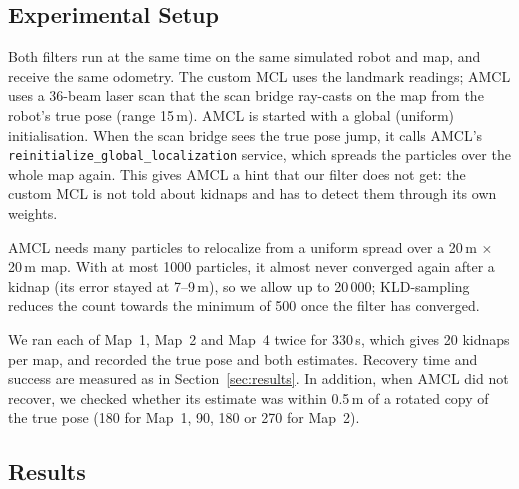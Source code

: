 \documentclass[12pt, a4paper]{article}
\begin{document}
\subsection{Experimental Setup}
Both filters run at the same time on the same simulated robot and map, and receive the same odometry.  The custom MCL uses the landmark readings; AMCL uses a 36-beam laser scan that the scan bridge ray-casts on the map from the robot's true pose (range 15\,m).  AMCL is started with a global (uniform) initialisation.  When the scan bridge sees the true pose jump, it calls AMCL's \texttt{reinitialize\_global\_localization} service, which spreads the particles over the whole map again.  This gives AMCL a hint that our filter does not get: the custom MCL is not told about kidnaps and has to detect them through its own weights.

AMCL needs many particles to relocalize from a uniform spread over a 20\,m \(\times\) 20\,m map.  With at most 1000 particles, it almost never converged again after a kidnap (its error stayed at 7--9\,m), so we allow up to 20\,000; KLD-sampling reduces the count towards the minimum of 500 once the filter has converged.

We ran each of Map~1, Map~2 and Map~4 twice for 330\,s, which gives 20 kidnaps per map, and recorded the true pose and both estimates.  Recovery time and success are measured as in Section~\ref{sec:results}.  In addition, when AMCL did not recover, we checked whether its estimate was within 0.5\,m of a rotated copy of the true pose (180\textdegree{} for Map~1, 90\textdegree{}, 180\textdegree{} or 270\textdegree{} for Map~2).

\subsection{Results}
\end{document}
